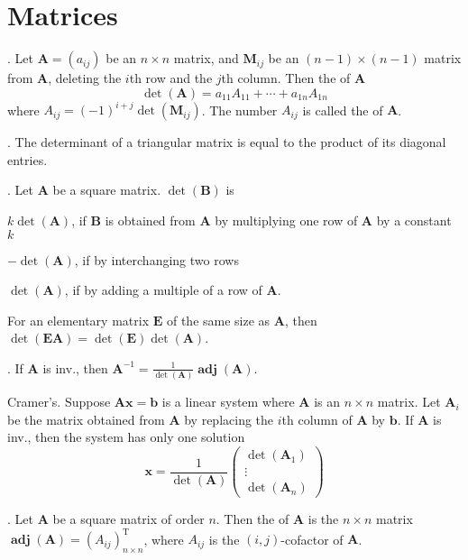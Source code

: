 \documentclass{slnotes}
\DeclareMathOperator*{\adj}{\mathbf{adj}}
\newcommand*{\TT}{\mathrm{T}}
\begin{document}
\chapter{Matrices}
. Let \(\mathbf{A} = (a_{ij})\) be an \(n \times n\) matrix, and \(\mathbf{M}_{ij}\) be an \((n - 1)\times(n - 1)\) matrix from \(\mathbf{A}\), deleting the \(i\)th row and the \(j\)th column. Then the  of \(\mathbf{A}\)\[\det(\mathbf A) = a_{11}A_{11} + \cdots + a_{1n}A_{1n}\]where \(A_{ij} = (-1)^{i+j}\det(\mathbf{M}_{ij})\). The number \(A_{ij}\) is called the  of \(\mathbf{A}\).

. The determinant of a triangular matrix is equal to the product of its diagonal entries.

. Let \(\mathbf{A}\) be a square matrix. \(\det(\mathbf B)\) is
\begin{slinenum}
\item \(k\det(\mathbf A)\), if \(\mathbf{B}\) is obtained from \(\mathbf{A}\) by multiplying one row of \(\mathbf{A}\) by a constant \(k\)
\item \(-\det(\mathbf A)\), if by interchanging two rows
\item \(\det(\mathbf A)\), if by adding a multiple of a row of \(\mathbf{A}\).
\end{slinenum}

For an elementary matrix \(\mathbf E\) of the same size as \(\mathbf A\), then \(\det(\mathbf{EA}) = \det(\mathbf E)\det(\mathbf A)\).

. If \(\mathbf A\) is inv., then \(\mathbf A^{-1} = \frac{1}{\det(\mathbf A)}\adj(\mathbf A)\).

 Cramer's. Suppose \(\mathbf{Ax} = \mathbf b\) is a linear system where \(\mathbf A\) is an \(n \times n\) matrix. Let \(\mathbf{A}_i\) be the matrix obtained from \(\mathbf A\) by replacing the \(i\)th column of \(\mathbf A\) by \(\mathbf b\). If \(\mathbf A\) is inv., then the system has only one solution\[\mathbf{x} = \frac{1}{\det(\mathbf A)}\begin{pmatrix}\det(\mathbf A_1)\\\vdots\\\det(\mathbf A_n)\end{pmatrix}\]

. Let \(\mathbf A\) be a square matrix of order \(n\). Then the  of \(\mathbf A\) is the \(n \times n\) matrix \(\adj(\mathbf A) = (A_{ij})^\TT_{n \times n}\), where \(A_{ij}\) is the \((i, j)\)-cofactor of \(\mathbf A\).
\end{document}
